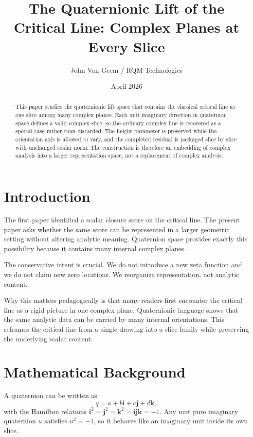 \documentclass[11pt]{article}
\title{The Quaternionic Lift of the Critical Line: Complex Planes at Every Slice}
\author{John Van Geem / RQM Technologies}
\date{April 2026}
\begin{document}
\maketitle

\begin{abstract}
This paper studies the quaternionic lift space that contains the classical critical line as one slice among many complex planes. Each unit imaginary direction in quaternion space defines a valid complex slice, so the ordinary complex line is recovered as a special case rather than discarded. The height parameter is preserved while the orientation axis is allowed to vary, and the completed residual is packaged slice by slice with unchanged scalar norm. The construction is therefore an embedding of complex analysis into a larger representation space, not a replacement of complex analysis.
\end{abstract}

\section{Introduction}
The first paper identified a scalar closure score on the critical line. The present paper asks whether the same score can be represented in a larger geometric setting without altering analytic meaning. Quaternion space provides exactly this possibility because it contains many internal complex planes.

The conservative intent is crucial. We do not introduce a new zeta function and we do not claim new zero locations. We reorganize representation, not analytic content.

Why this matters pedagogically is that many readers first encounter the critical line as a rigid picture in one complex plane. Quaternionic language shows that the same analytic data can be carried by many internal orientations. This reframes the critical line from a single drawing into a slice family while preserving the underlying scalar content.

\section{Mathematical Background}
A quaternion can be written as
\[
q=a+b\mathbf i+c\mathbf j+d\mathbf k,
\]
with the Hamilton relations $\mathbf i^2=\mathbf j^2=\mathbf k^2=\mathbf i\mathbf j\mathbf k=-1$. Any unit pure imaginary quaternion $u$ satisfies $u^2=-1$, so it behaves like an imaginary unit inside its own slice.
\end{document}
